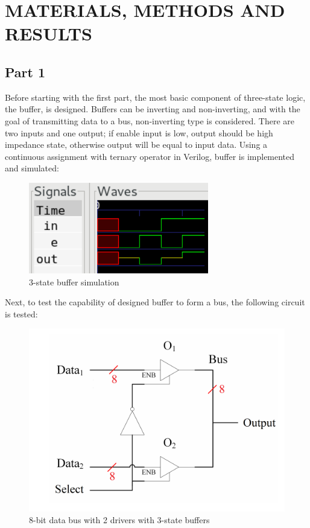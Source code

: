 \documentclass[pdftex,12pt,a4paper]{article}
\begin{document}
\section{MATERIALS, METHODS AND RESULTS}
\subsection{Part 1}
Before starting with the first part, the most basic component of three-state logic, the buffer, is designed. Buffers can be inverting and non-inverting, and with the goal of transmitting data to a bus, non-inverting type is considered. There are two inputs and one output; if enable input is low, output should be high impedance state, otherwise output will be equal to input data. Using a continuous assignment with ternary operator in Verilog, buffer is implemented and simulated:
\begin{figure}[H]
\centering
\includegraphics[width=0.7\textwidth]{buffer_wave.png}
\caption{3-state buffer simulation}
\end{figure}

Next, to test the capability of designed buffer to form a bus, the following circuit is tested:

\begin{figure}[H]
\centering
\includegraphics[width=\textwidth]{part1_original.png}
\caption{8-bit data bus with 2 drivers with 3-state buffers}
\end{figure}
\end{document}
